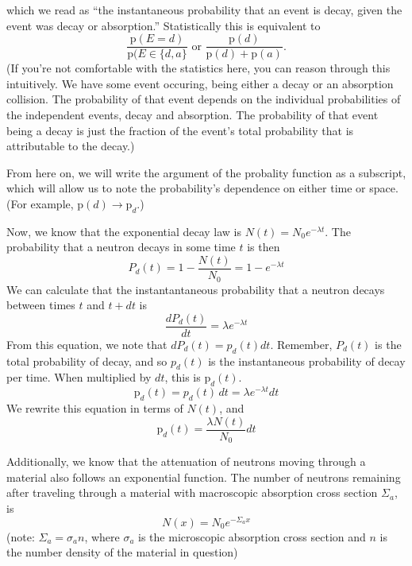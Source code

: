 \documentclass{report}
\begin{document}
which we read as ``the instantaneous probability that an event is decay, given the event was decay or absorption.'' Statistically this is equivalent to
\begin{equation}
\label{prob}
\frac{\text{p}(E=d)}{\text{p}(E \in \{d,a\}} \text{ or } \frac{\text{p}(d)}{\text{p}(d) + \text{p}(a)}.
\end{equation}
(If you're not comfortable with the statistics here, you can reason through this intuitively. We have some event occuring, being either a decay or an absorption collision. The probability of that event depends on the individual probabilities of the independent events, decay and absorption. The probability of that event being a decay is just the fraction of the event's total probability that is attributable to the decay.)

From here on, we will write the argument of the probality function as a subscript, which will allow us to note the probability's dependence on either time or space. (For example, $\text{p}(d) \rightarrow \text{p}_d$.)

Now, we know that the exponential decay law is $N(t) = N_0 e^{-\lambda t}$. The probability that a neutron decays in some time $t$ is then
$$ P_d(t) = 1-\frac{N(t)}{N_0} = 1-e^{-\lambda t} $$
We can calculate that the instantantaneous probability that a neutron decays between times $t$ and $t+dt$ is 
$$ \frac{dP_d(t)}{dt} = \lambda e^{-\lambda t} $$
From this equation, we note that $dP_d(t) = p_d(t)dt$. Remember, $P_d(t)$ is the total probability of decay, and so $p_d(t)$ is the instantaneous probability of decay per time. When multiplied by $dt$, this is $\text{p}_d(t)$.
$$ \text{p}_d(t) = p_d(t) \, dt = \lambda e^{-\lambda t} dt $$
We rewrite this equation in terms of $N(t)$, and  
$$ \text{p}_d(t) = \frac{\lambda N(t)}{N_0} dt$$

Additionally, we know that the attenuation of neutrons moving through a material also follows an exponential function. The number of neutrons remaining after traveling through a material with macroscopic absorption cross section $\Sigma_a$, is
$$ N(x) = N_0 e^{-\Sigma_a x} $$
(note: $\Sigma_a = \sigma_a n$, where $\sigma_a$ is the microscopic absorption cross section and $n$ is the number density of the material in question) 
\end{document}
